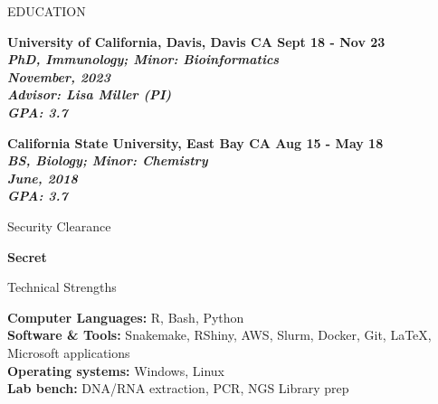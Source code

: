\documentclass{resume} %
\begin{document}

\begin{rSection}{EDUCATION}

\bf University of California, Davis, Davis CA
\hfill Sept 18 - Nov 23\\
\sl PhD, Immunology; Minor: Bioinformatics \\
\textit November, 2023 \\
\textit{Advisor:} Lisa Miller (PI) \\
\hfill GPA: 3.7

\bf California State University, East Bay CA 
\hfill Aug 15 - May 18\\
\sl BS, Biology; Minor: Chemistry \\
\textit June, 2018 \\
\hfill GPA: 3.7

\end{rSection}


\begin{rSection}{Security Clearance}

\bf Secret

\end{rSection}


\begin{rSection}{Technical Strengths}

\textbf{Computer Languages:} R, Bash, Python \\
\textbf{Software \& Tools:} Snakemake, RShiny, AWS, Slurm, Docker, Git, LaTeX, Microsoft applications \\
\textbf{Operating systems:} Windows, Linux \\
\textbf{Lab bench:} DNA/RNA extraction, PCR, NGS Library prep \\

\end{rSection}

\end{document}
